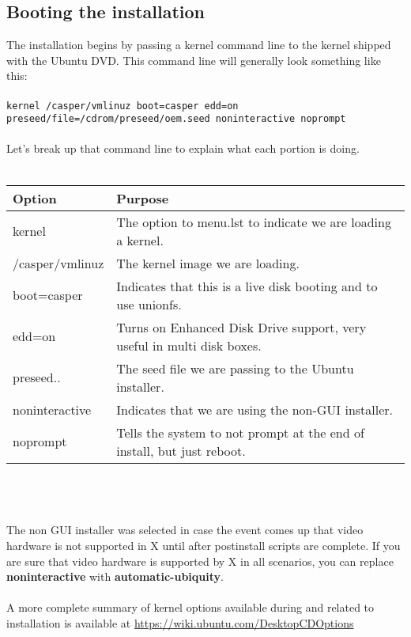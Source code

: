 \documentclass[letterpaper,10pt,titlepage]{article}
\begin{document}
\subsection{Booting the installation}
The installation begins by passing a kernel command line to the kernel shipped with the Ubuntu DVD.  This command line will generally look something like this:
\\
\\
\texttt{kernel /casper/vmlinuz boot=casper edd=on preseed/file=/cdrom/preseed/oem.seed noninteractive noprompt}
\\
\\
Let's break up that command line to explain what each portion is doing.
\\
\\
\begin{tabular}{|l|l|}
\hline \textbf{Option} & \textbf{Purpose} \\
\hline kernel & The option to menu.lst to indicate we are loading a kernel. \\
\hline /casper/vmlinuz &  The kernel image we are loading. \\
\hline boot=casper & Indicates that this is a live disk booting and to use unionfs. \\
\hline edd=on & Turns on Enhanced Disk Drive support, very useful in multi disk boxes. \\
\hline preseed.. & The seed file we are passing to the Ubuntu installer. \\
\hline noninteractive & Indicates that we are using the non-GUI installer. \\
\hline noprompt & Tells the system to not prompt at the end of install, but just reboot. \\
\hline
\end{tabular}
\\
\\
\\
The non GUI installer was selected in case the event comes up that video hardware is not supported in X until after postinstall scripts are complete.  If you are sure that video hardware is supported by X in all scenarios, you can replace \textbf{noninteractive} with \textbf{automatic-ubiquity}.
\\
\\
A more complete summary of kernel options available during and related to installation is available at \url{https://wiki.ubuntu.com/DesktopCDOptions}
\end{document}
